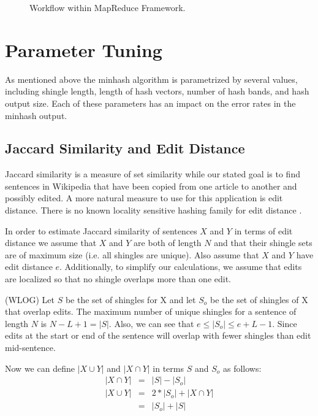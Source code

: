 \documentclass{acm_proc_article-sp}
\begin{document}
\begin{figure}
\centering
{}
\caption{Workflow within MapReduce Framework.}
\end{figure}

\section{Parameter Tuning}

As mentioned above the minhash algorithm is parametrized by several values, including shingle length, length of hash vectors, number of hash bands, and hash output size. Each of these parameters has an impact on the error rates in the minhash output. 

\subsection{Jaccard Similarity and Edit Distance}

Jaccard similarity is a measure of set similarity while our stated goal is to find sentences in Wikipedia that have been copied from one article to another and possibly edited. A more natural measure to use for this application is edit distance. There is no known locality sensitive hashing family for edit distance \citation{}.

In order to estimate Jaccard similarity of sentences $X$ and $Y$ in terms of edit distance we assume that $X$ and $Y$ are both of length $N$ and that their shingle sets are of maximum size (i.e. all shingles are unique). Also assume that $X$ and $Y$ have edit distance $e$.  Additionally, to simplify our calculations, we assume that edits are localized so that no shingle overlaps more than one edit.

(WLOG) Let $S$ be the set of shingles for X and let $S_o$ be the set of shingles of X that overlap edits. The maximum number of unique shingles for a sentence of length $N$ is $N - L + 1 = |S|$. Also, we can see that $e \le |S_o| \le e + L - 1$. Since edits at the start or end of the sentence will overlap with fewer shingles than edit mid-sentence.

Now we can define $|X \cup Y|$ and $|X \cap Y|$ in terms $S$ and $S_o$ as follows:
\begin{eqnarray*}
|X \cap Y| & = & |S| - |S_o| \\
|X \cup Y| & = & 2*|S_o| + |X \cap Y| \\
           & = & |S_o| + |S|
\end{eqnarray*}
\end{document}

